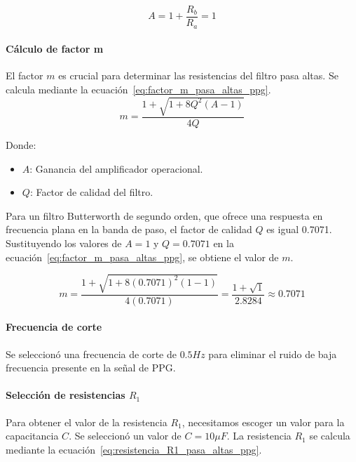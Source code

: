         \begin{equation}
            \label{eq:funcion_amplificador_operacional_pasa_altas_ppg}
            A = 1 + \frac{R_b}{R_a} = 1
        \end{equation}

        \paragraph{Cálculo de factor m}
        El factor $m$ es crucial para determinar las resistencias del filtro pasa altas. Se calcula mediante la ecuación~\ref{eq:factor_m_pasa_altas_ppg}.
        \begin{equation}
            \label{eq:factor_m_pasa_altas_ppg}
            m = \frac{1+\sqrt{1+8Q^2(A-1)}}{4Q}
        \end{equation}

        Donde:

        \begin{itemize}
            \item $A$: Ganancia del amplificador operacional.
            \item $Q$: Factor de calidad del filtro.
        \end{itemize}

        Para un filtro Butterworth de segundo orden, que ofrece una respuesta en frecuencia plana en la banda de paso, el factor de calidad $Q$ es igual 0.7071. Sustituyendo los valores de $A = 1$ y $Q = 0.7071$ en la ecuación~\ref{eq:factor_m_pasa_altas_ppg}, se obtiene el valor de $m$.

        \begin{equation}
            \label{eq:factor_m_pasa_altas_ppg_valor}
            m = \frac{1+\sqrt{1+8(0.7071)^2(1-1)}}{4(0.7071)} = \frac{1 + \sqrt{1}}{2.8284}\approx 0.7071
        \end{equation}

        \paragraph{Frecuencia de corte}
        Se seleccionó una frecuencia de corte de $0.5 Hz$ para eliminar el ruido de baja frecuencia presente en la señal de PPG.

        \paragraph{Selección de resistencias $R_1$}
        Para obtener el valor de la resistencia $R_1$, necesitamos escoger un valor para la capacitancia $C$. Se seleccionó un valor de $C = 10 \mu F$. La resistencia $R_1$ se calcula mediante la ecuación~\ref{eq:resistencia_R1_pasa_altas_ppg}.

